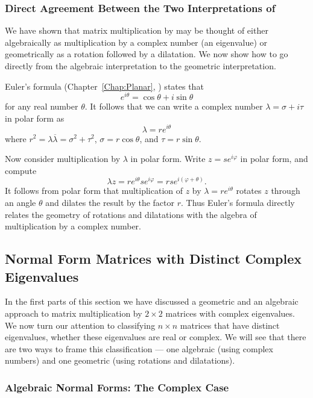 \subsubsection*{Direct Agreement Between the Two Interpretations of 
\protect{}}   

We have shown that matrix multiplication by  may be thought 
of either algebraically as multiplication by a complex number (an eigenvalue)
or geometrically as a rotation followed by a dilatation.  We now show how to
go directly from the algebraic interpretation to the geometric interpretation.

Euler's formula (Chapter~\ref{Chap:Planar}, 
) states that
\[
e^{i\theta} = \cos\theta + i\sin\theta
\]
for any real number $\theta$. It follows that we can write a 
complex number $\lambda=\sigma+i\tau$ in polar form as
\[
\lambda = re^{i\theta}
\]
where $r^2=\lambda\overline{\lambda}=\sigma^2+\tau^2$, $\sigma=r\cos\theta$,
and $\tau=r\sin\theta$.  

Now consider multiplication by $\lambda$ in polar form.  Write 
$z=se^{i\varphi}$ in polar form, and compute
\[
\lambda z = re^{i\theta}se^{i\varphi} = rse^{i(\varphi+\theta)}.
\]
It follows from polar form that multiplication of $z$ by 
$\lambda=re^{i\theta}$  rotates 
$z$ through an angle $\theta$ and dilates the result by the factor $r$.
Thus Euler's formula directly relates the geometry of 
rotations and 
dilatations with the 
algebra of multiplication by a complex number.


\subsection*{Normal Form Matrices with Distinct Complex Eigenvalues}

In the first parts of this section we have discussed a geometric and 
an algebraic approach to matrix multiplication by $2\times 2$ matrices with 
complex eigenvalues.   We now turn our attention to classifying $n\times n$ 
matrices that have distinct eigenvalues, whether these eigenvalues are real 
or complex.  We will see that there are two ways to frame this classification 
--- one algebraic (using complex numbers) and one geometric (using rotations 
and dilatations).

\subsubsection*{Algebraic Normal Forms: The Complex Case}

